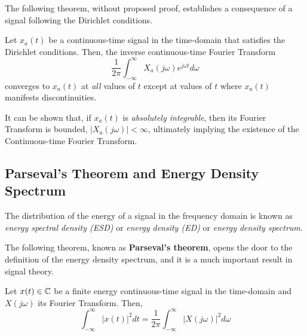 \documentclass[\documentfontsize, twocolumn]{\classname}
\begin{document}
The following theorem, without proposed proof, establishes a consequence of a signal following the Dirichlet conditions.

\begin{thm}
    Let $x_a(t)$ be a continuous-time signal in the time-domain that satisfies the Dirichlet conditions. Then, the inverse continuous-time Fourier Transform
    \[
        \frac 1 {2\pi}\int_{-\infty}^\infty X_a(j\omega) e^{j\omega t}d\omega
    \]
    converges to $x_a(t)$ at \emph{all} values of $t$ except at values of $t$ where $x_a(t)$ manifests discontinuities.
\end{thm}

It can be shown that, if $x_a(t)$ is \emph{absolutely integrable}, then its Fourier Transform is bounded, $\left|X_a(j\omega)\right|<\infty$, ultimately implying the existence of the Continuous-time Fourier Transform.

\subsection{Parseval's Theorem and Energy Density Spectrum}

The distribution of the energy of a signal in the frequency domain is known as \emph{energy spectral density (ESD)} or \emph{energy density (ED)} or \emph{energy density spectrum}.

The following theorem, known as \textbf{Parseval's theorem}, opens the door to the definition of the energy density spectrum, and it is a much important result in signal theory.

\begin{thm}
    Let $x(t) \in \mathbb C$ be a finite energy continuous-time signal in the time-domain and $X(j\omega)$ its Fourier Transform. Then,
    \begin{equation}\label{eqn:parsevalTheorem}
        \int_{-\infty}^\infty|x(t)|^2dt = \frac 1 {2\pi} \int_{-\infty}^\infty\left|X(j\omega)\right|^2 d\omega
    \end{equation}
\end{thm}
\end{document}
